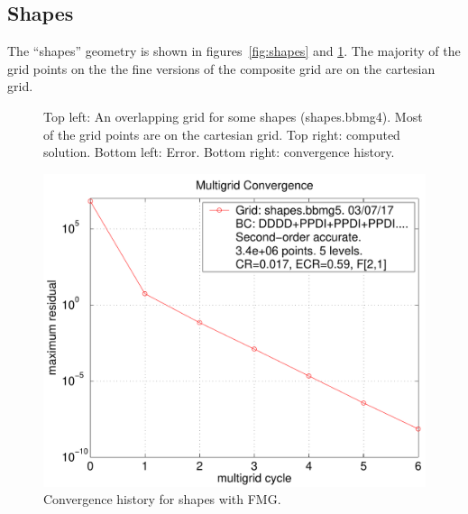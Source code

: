

\clearpage
\subsection{Shapes}

   The ``shapes'' geometry is shown in figures~\ref{fig:shapes} and \ref{fig:shapes2}. 
The majority of the grid points on the the fine versions of the composite grid are on
the cartesian grid. 

{
\newcommand{\figWidth}{7.cm}
\newcommand{\trimfig}[2]{\trimPlotb{#1}{#2}{.0}{.0}{.0}{.0}}
\begin{figure}[hbt]
\begin{center}
\end{center}
\caption{Top left: An overlapping grid for some shapes (shapes.bbmg4). 
Most of the grid points are on the cartesian grid.
Top right: computed solution. Bottom left: Error. Bottom right: convergence history.
} \label{fig:shapes2}
\end{figure}
}

\begin{figure}[hbt]
\begin{center}
  \includegraphics[width=.475\linewidth]{fig/residual_shapes_bbmg5_fmg}
  \end{center} 
\caption{Convergence history for shapes with FMG.}
\label{fig:shapes.bbmg5}
\end{figure}


